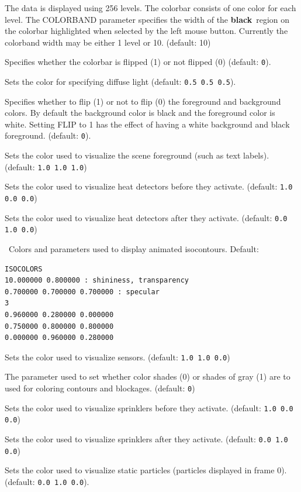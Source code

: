 \documentclass[11pt,twoside]{book}
\newcommand{\hitem}[1]{\item[{\bf #1} \hfill]}
\begin{document}
\hitem{COLORBAND} The data is displayed using 256 levels.  The colorbar consists of one color for each level.  The COLORBAND parameter specifies the width of the {\bf black}\ region on the colorbar highlighted when selected by the left mouse button.  Currently the colorband width may be either 1 level or 10. (default: 10)

\hitem{COLORBARFLIP} Specifies whether the colorbar is flipped (1) or not flipped (0)
(default: {\tt 0}).
\hitem{DIFFUSELIGHT} Sets the color for specifying diffuse light (default: {\tt 0.5 0.5
0.5}).
\hitem{FLIP} Specifies whether to flip (1) or not to flip (0) the foreground and background
colors.  By default the background color is black and the foreground color
is white.  Setting FLIP to 1 has the effect of having a white background and black foreground.
(default: {\tt 0}).

\hitem{FOREGROUNDCOLOR}Sets the color used to visualize
the scene foreground (such as text labels).
(default: {\tt 1.0 1.0 1.0})

\hitem{HEATOFFCOLOR}Sets the color used to visualize
heat detectors before they activate.
(default: {\tt 1.0 0.0 0.0})

\hitem{HEATONCOLOR}Sets the color used to visualize
heat detectors after they activate.
(default: {\tt 0.0 1.0 0.0})


\hitem{ISOCOLORS}\ Colors and parameters used to display animated isocontours.
Default:
\begin{lstlisting}
ISOCOLORS
10.000000 0.800000 : shininess, transparency
0.700000 0.700000 0.700000 : specular
3
0.960000 0.280000 0.000000
0.750000 0.800000 0.800000
0.000000 0.960000 0.280000
\end{lstlisting}

\hitem{SENSORCOLOR}Sets the color used to visualize sensors.
(default: {\tt 1.0 1.0 0.0})

\hitem{SETBW}The parameter used to set whether color shades (0) or shades of gray (1)
are to used for coloring contours and blockages.
(default: {\tt 0})

\hitem{SPRINKOFFCOLOR}Sets the color used to visualize
sprinklers before they activate.
(default: {\tt 1.0 0.0 0.0})

\hitem{SPRINKONCOLOR}Sets the color used to visualize
sprinklers after they activate.
(default: {\tt 0.0 1.0 0.0})

\hitem{STATICPARTCOLOR}Sets the color used to visualize static particles (particles
displayed in frame 0).
 (default: {\tt 0.0 1.0 0.0}).
\end{document}
